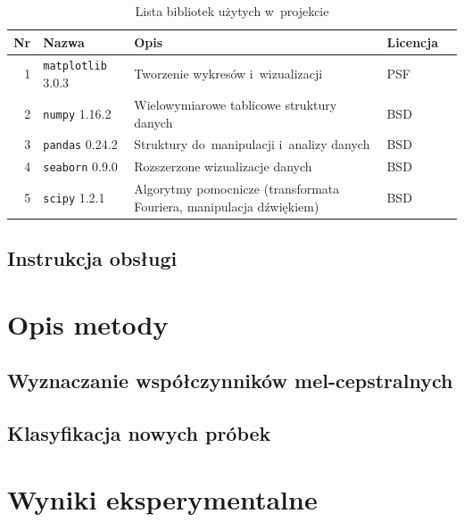 \documentclass[11pt,a4paper]{article}
\begin{document}
\begin{table}
    \begin{tabularx}{\textwidth}{|r|l|X|l|c|}
        \hline
        Nr & Nazwa & Opis & Licencja & \\
        \hline
        \hline
        1 & \texttt{matplotlib} 3.0.3 & Tworzenie wykresów i~wizualizacji & PSF & \cite{hunter2007} \\
        \hline
        2 & \texttt{numpy} 1.16.2 & Wielowymiarowe tablicowe struktury danych & BSD & \cite{oliphant2006} \\
        \hline
        3 & \texttt{pandas} 0.24.2 & Struktury do~manipulacji i~analizy danych & BSD & \cite{mckinney2010} \\
        \hline
        4 & \texttt{seaborn} 0.9.0 & Rozszerzone wizualizacje danych & BSD & \cite{waskom2018} \\
        \hline
        5 & \texttt{scipy} 1.2.1 & Algorytmy pomocnicze (transformata Fouriera, manipulacja dźwiękiem) & BSD & \cite{jones2001} \\
        \hline
    \end{tabularx}
    \caption{Lista bibliotek użytych w~projekcie}
    \label{tbl:libraries}
\end{table}

\subsection{Instrukcja obsługi}

\section{Opis metody}
\label{sec:method}

\subsection{Wyznaczanie współczynników mel-cepstralnych}

\subsection{Klasyfikacja nowych próbek}

\section{Wyniki eksperymentalne}
\end{document}
